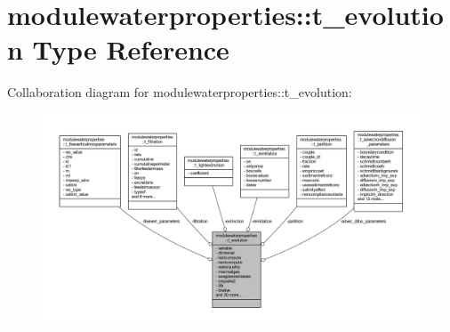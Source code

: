 \hypertarget{structmodulewaterproperties_1_1t__evolution}{}\section{modulewaterproperties\+:\+:t\+\_\+evolution Type Reference}
\label{structmodulewaterproperties_1_1t__evolution}


Collaboration diagram for modulewaterproperties\+:\+:t\+\_\+evolution\+:\nopagebreak
\begin{figure}[H]
\begin{center}
\leavevmode
\includegraphics[width=350pt]{structmodulewaterproperties_1_1t__evolution__coll__graph}
\end{center}
\end{figure}
